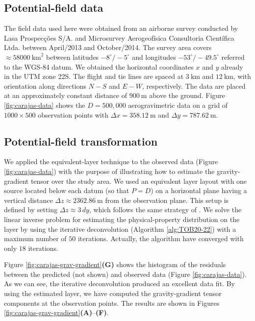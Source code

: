 \subsection{Potential-field data}

The field data used here were obtained from an airborne survey conducted by Lasa Prospec{\c c}{\~o}es S/A. 
and Microsurvey Aerogeof{\'i}sica Consultoria Cient{\'i}fica Ltda. between April/2013 and October/2014.
The survey area covers $\approx 58000 \: \mathrm{km}^2$ between latitudes $-8^{\circ} \slash -5^{\circ}$
and longitudes $-53^{\circ} \slash -49.5^{\circ}$ referred to the WGS-84 datum.
We obtained the horizontal coordinates $x$ and $y$ already in the UTM zone 22S. 
The flight and tie lines are spaced at $3 \: \mathrm{km}$  and $12 \: \mathrm{km}$, with orientation along 
directions $N-S$ and $E-W$, respectively.
The data are placed at an approximately constant distance of $900 \: \mathrm{m}$ above the ground.
Figure \ref{fig:carajas-data} shows the $D = 500,000$ aerogravimetric data on a grid of 
$1000 \times 500$ observation points with $\Delta x = 358.12 \: \mathrm{m}$ and $\Delta y = 787.62 \: \mathrm{m}$. 

\subsection{Potential-field transformation}

We applied the equivalent-layer technique to the observed data (Figure \ref{fig:carajas-data}) with the
purpose of illustrating how to estimate the gravity-gradient tensor over the study area.
We used an equivalent layer layout with one source located below each datum
(so that $P=D$) on a horizontal plane having a vertical distance $\Delta z \approx 2362.86 \: \mathrm{m}$ from the observation plane.
This setup is defined by setting $\Delta z \approx 3 \, dy$, which follows the same strategy of \citet{reis-etal2020}.
We solve the linear inverse problem for estimating the physical-property distribution on the layer by
using the iterative deconvolution (Algorithm \ref{alg:TOB20-22}) with a maximum number of $50$ iterations. 
Actually, the algorithm have converged with only $18$ iterations.

Figure \ref{fig:carajas-grav-gradient}\textbf{(G)} shows the histogram of the residuals between the predicted 
(not shown) and observed data (Figure \ref{fig:carajas-data}).
As we can see, the iterative deconvolution produced an excellent data fit.
By using the estimated layer, we have computed the gravity-gradient tensor components at the observation points.
The results are shown in Figures \ref{fig:carajas-grav-gradient}\textbf{(A)}--\textbf{(F)}.

